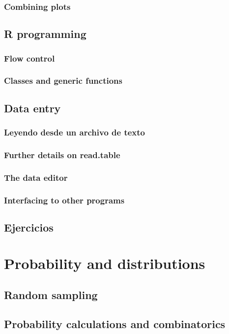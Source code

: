 \documentclass[spanish]{extbook}
\numberwithin{equation}{section}
\numberwithin{figure}{section}
\begin{document}
\subsection{Combining plots}

\section{R programming}
\subsection{Flow control} \label{flowcontrol}
\subsection{Classes and generic functions}

\section{Data entry}
\subsection{Leyendo desde un archivo de texto} \label{readtextfile}
\subsection{Further details on read.table}
\subsection{The data editor}
\subsection{Interfacing to other programs}
\section{Ejercicios}

\chapter{Probability and distributions}
\section{Random sampling}
\section{Probability calculations and combinatorics}
\end{document}
